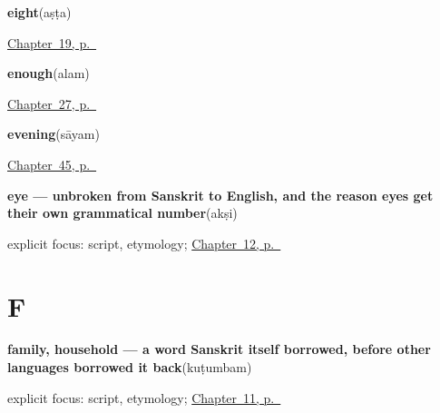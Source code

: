 \noindent\begin{minipage}[t]{\linewidth}
\raggedright
\textbf{eight}\enspace\emph{}\enspace(aṣṭa)\par
\footnotesize \hyperref[ch:sa-numbers-6-10]{Chapter~19, p.~\pageref*{ch:sa-numbers-6-10}}
\end{minipage}\par\smallskip

\noindent\begin{minipage}[t]{\linewidth}
\raggedright
\textbf{enough}\enspace\emph{}\enspace(alam)\par
\footnotesize \hyperref[ch:sa-replies]{Chapter~27, p.~\pageref*{ch:sa-replies}}
\end{minipage}\par\smallskip

\noindent\begin{minipage}[t]{\linewidth}
\raggedright
\textbf{evening}\enspace\emph{}\enspace(sāyam)\par
\footnotesize \hyperref[ch:sa-times-of-the-day]{Chapter~45, p.~\pageref*{ch:sa-times-of-the-day}}
\end{minipage}\par\smallskip

\noindent\begin{minipage}[t]{\linewidth}
\raggedright
\textbf{eye — unbroken from Sanskrit to English, and the reason eyes get their own grammatical number}\enspace\emph{}\enspace(akṣi)\par
\footnotesize explicit focus: script, etymology; \hyperref[ch:sa-face-nouns-1]{Chapter~12, p.~\pageref*{ch:sa-face-nouns-1}}
\end{minipage}\par\smallskip

\section*{F}

\noindent\begin{minipage}[t]{\linewidth}
\raggedright
\textbf{family, household — a word Sanskrit itself borrowed, before other languages borrowed it back}\enspace\emph{}\enspace(kuṭumbam)\par
\footnotesize explicit focus: script, etymology; \hyperref[ch:sa-people-nouns]{Chapter~11, p.~\pageref*{ch:sa-people-nouns}}
\end{minipage}\par\smallskip

